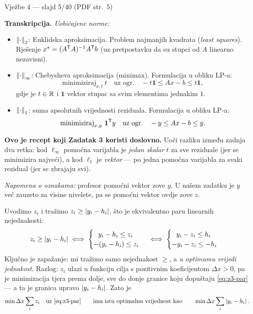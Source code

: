 \begin{izvor}{Vježbe 4 --- slajd 5/40 (PDF str.~5)}

\textbf{Transkripcija.} \emph{Uobičajene norme:}
\begin{itemize}[leftmargin=*]
  \item $\left\lVert \cdot \right\rVert_2$: Euklidska aproksimacija. Problem najmanjih kvadrata
        (\emph{least squares}). Rješenje $x^{\star} = (A^{\mathsf{T}} A)^{-1}A^{\mathsf{T}} b$ (uz
        pretpostavku da su stupci od $A$ linearno nezavisni).
  \item $\left\lVert \cdot \right\rVert_\infty$: Chebysheva aproksimacija (minimax). Formulacija u
        obliku LP-a:
        \[
          \text{minimiziraj}_{x,t}\ t \quad \text{uz ogr.}\quad -t\mathbf{1} \leq Ax - b \leq t\mathbf{1},
        \]
        gdje je $t \in \mathbb{R}$ i $\mathbf{1}$ vektor stupac sa svim elementima
        jednakim $1$.
  \item $\left\lVert \cdot \right\rVert_1$: suma apsolutnih vrijednosti reziduala. Formulacija u
        obliku LP-a:
        \[
          \text{minimiziraj}_{x,y}\ \mathbf{1}^{\mathsf{T}} y \quad \text{uz ogr.}\quad -y \leq Ax - b \leq y .
        \]
\end{itemize}

\textbf{Ovo je recept koji Zadatak 3 koristi doslovno.} Uoči razliku između
zadnja dva retka: kod $\ell_\infty$ pomoćna varijabla je \emph{jedan skalar} $t$
za sve reziduale (jer se minimizira najveći), a kod $\ell_1$ je \emph{vektor} ---
po jedna pomoćna varijabla za svaki rezidual (jer se zbrajaju svi).

\emph{Napomena o oznakama:} profesor pomoćni vektor zove $y$. U našem zadatku je
$y$ već zauzeto za visine nivelete, pa se pomoćni vektor ovdje zove $z$.
\end{izvor}

\begin{korak}
Uvodimo $z_i$ i tražimo $z_i \geq \left\lvert y_i - h_i \right\rvert$, što je ekvivalentno paru
linearnih nejednakosti:
\begin{equation}
z_i \geq \left\lvert y_i - h_i \right\rvert
\iff
\begin{cases}
\ \ y_i - h_i \leq z_i \\
-(y_i - h_i) \leq z_i
\end{cases}
\iff
\begin{cases}
\ \ y_i - z_i \leq h_i \\
-y_i - z_i \leq -h_i
\end{cases}
\label{eq:z3-par}
\end{equation}
Ključno je zapažanje: mi tražimo samo nejednakost $\geq$, a \emph{u optimumu
vrijedi jednakost}. Razlog: $z_i$ ulazi u funkciju cilja s pozitivnim
koeficijentom $\Delta x > 0$, pa je minimizacija tjera prema dolje, sve do donje
granice koju dopuštaju \eqref{eq:z3-par} --- a ta je granica upravo
$\left\lvert y_i - h_i \right\rvert$. Zato je
\begin{equation}
\min \Delta x \sum_i z_i \quad\text{uz \eqref{eq:z3-par}}
\qquad\text{ima istu optimalnu vrijednost kao}\qquad
\min \Delta x \sum_i \left\lvert y_i - h_i \right\rvert.
\end{equation}
\end{korak}

